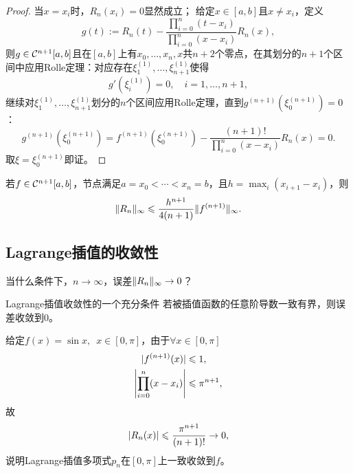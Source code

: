 \begin{proof}
    当$x = x_i$时，$R_n(x_i) = 0$显然成立；
    给定$x \in [a,b]$且$x \neq x_i$，定义
    \[
        g(t) := R_n(t) - \frac{\prod_{i=0}^n(t - x_i)}{\prod_{i=0}^n(x - x_i)}R_n(x),
    \]
    则$g \in \mathcal{C}^{n+1}[a,b]$且在$[a,b]$上有$x_0,\ldots,x_n,x$共$n + 2$个零点，在其划分的$n + 1$个区间中应用Rolle定理：对应存在$\xi_1^{(1)},\ldots,\xi_{n+1}^{(1)}$使得
    \[
        g'(\xi_i^{(1)}) = 0,\quad i = 1,\ldots,n + 1,
    \]
    继续对$\xi_1^{(1)},\ldots,\xi_{n+1}^{(1)}$划分的$n$个区间应用Rolle定理，直到$g^{(n+1)}(\xi^{(n+1)}_0) = 0$：
    \[
        g^{(n+1)}(\xi^{(n+1)}_0) = f^{(n+1)}(\xi^{(n+1)}_0) - \frac{(n + 1)!}{\prod_{i=0}^n(x - x_i)}R_n(x) = 0.
    \]
    取$\xi = \xi_0^{(n+1)}$即证。
\end{proof}

\begin{corollary}
    若$f \in \mathcal{C}^{n+1}[a,b]$，节点满足$a = x_0 < \cdots < x_n = b$，且$\textstyle h = \max_i(x_{i+1} - x_i)$，则
    \begin{equation}
        \lVert R_n\rVert_\infty \leqslant \frac{h^{n+1}}{4(n + 1)}\lVert f^{(n+1)}\rVert_\infty.
    \end{equation}
\end{corollary}

\subsection{Lagrange插值的收敛性}

当什么条件下，$n \to \infty$，误差$\lVert R_n\rVert_\infty \to 0$？

\begin{theorem}
    {Lagrange插值收敛性的一个充分条件}{}
    若被插值函数的任意阶导数一致有界，则误差收敛到0。
\end{theorem}

\begin{example}
    {}{}
    给定$f(x) = \sin x,\enspace x \in [0,\pi]$，由于$\forall x \in [0,\pi]$
    \begin{align*}
        \lvert f^{(n+1)}(x)\rvert &\leqslant 1,\\
        \Biggl\lvert\prod_{i=0}^n(x - x_i)\Biggr\rvert &\leqslant \pi^{n+1},
    \end{align*}
    故
    \[
        \lvert R_n(x)\rvert \leqslant \frac{\pi^{n+1}}{(n + 1)!} \to 0,
    \]
    说明Lagrange插值多项式$p_n$在$[0,\pi]$上一致收敛到$f$。
\end{example}



